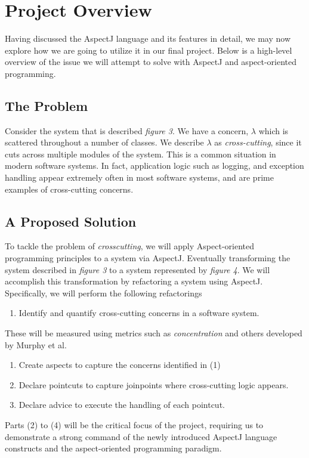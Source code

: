 \documentclass[sigconf]{acmart}
\begin{document}
 \section{Project Overview}
 Having discussed the AspectJ language and its features in detail, we may now explore how we are going to utilize it in our final project. Below is a high-level overview of the issue we will attempt to solve with AspectJ and aspect-oriented programming.
 \subsection{The Problem}
 Consider the system that is described \textit{figure 3}. We have a concern, $\lambda$ which is scattered throughout a number of classes. We describe $\lambda$ as \textit{cross-cutting}, since it cuts across multiple modules of the system. This is a common situation in modern software systems. In fact, application logic such as logging, and exception handling \cite{aop-ECCOP} appear extremely often in most software systems, and are prime examples of cross-cutting concerns.

\subsection{A Proposed Solution}
To tackle the problem of \textit{crosscutting}, we will apply Aspect-oriented programming principles to a system via AspectJ. Eventually transforming the system described in \textit{figure 3} to a system represented by \textit{figure 4}. We will accomplish this transformation by refactoring a system using AspectJ. Specifically, we will perform the following refactorings
\begin{enumerate}
    \item Identify and quantify cross-cutting concerns in a software system.
\end{enumerate}
These will be measured using metrics such as \textit{concentration} \cite{murphy} and others developed by Murphy et al.
\begin{enumerate}[resume]
    \item Create aspects to capture the concerns identified in (1)
    \item Declare pointcuts to capture joinpoints where cross-cutting logic appears.
    \item Declare advice to execute the handling of each pointcut.
\end{enumerate}
Parts (2) to (4) will be the critical focus of the project, requiring us to demonstrate a strong command of the newly introduced AspectJ language constructs and the aspect-oriented programming paradigm.
\end{document}
